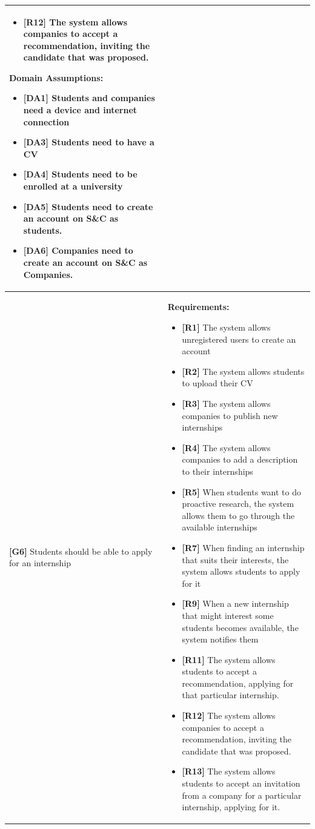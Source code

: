 \begin{longtable}{|p{}|p{}|}
\begin{itemize}
    \item  \textbf{[R12]} The system allows companies to accept a recommendation, inviting the candidate that was proposed.
\end{itemize}
\textbf{Domain Assumptions:}
\begin{itemize}
     \item \textbf{[DA1]} Students and companies need a device and internet connection
     \item \textbf{[DA3]} Students need to have a CV
     \item \textbf{[DA4]} Students need to be enrolled at a university
    \item \textbf{[DA5]} Students need to create an account on S\&C as students.
    \item \textbf{[DA6]} Companies need to create an account on S\&C as Companies.
\end{itemize} \\
\hline
\hline
\textbf{[G6]}  Students should be able to apply for an internship
& 
\textbf{Requirements:}
\begin{itemize}
    \item \textbf{[R1]} The system allows unregistered users to create an account
    \item \textbf{[R2]} The system allows students to upload their CV
    \item \textbf{[R3]} The system allows companies to publish new internships
    \item \textbf{[R4]} The system allows companies to add a description to their internships
    \item \textbf{[R5]} When students want to do proactive research, the system allows them to go through the available internships
    \item \textbf{[R7]} When finding an internship that suits their interests, the system allows students to apply for it
    \item  \textbf{[R9]} When a new internship that might interest some students becomes available, the system notifies them
    \item  \textbf{[R11]} The system allows students to accept a recommendation, applying for that particular internship.
    \item  \textbf{[R12]} The system allows companies to accept a recommendation, inviting the candidate that was proposed.
    \item \textbf{[R13]} The system allows students to accept an invitation from a company for a particular internship, applying for it.

\end{itemize}
\end{longtable}
